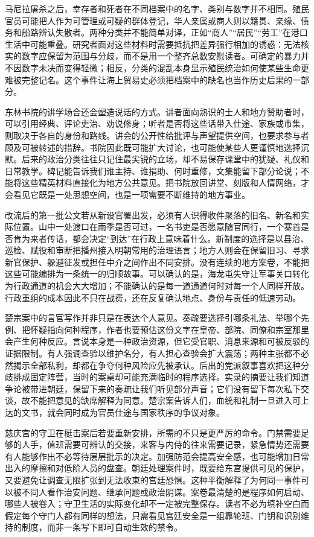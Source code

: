 马尼拉屠杀之后，幸存者和死者在不同档案中的名字、类别与数字并不相同。殖民官员可能把人作为可管理或可疑的群体登记，华人亲属或商人则以籍贯、亲缘、债务和船路辨认失散者。两种分类并不能简单对译，正如“商人”“居民”“劳工”在港口生活中可能重叠。研究者面对这些材料时需要抵抗把差异强行相加的诱惑：无法核实的数字应保留为范围与分歧，而不是用一个整齐总数安慰读者。可确定的暴力并不因数字未决而变得轻微；相反，分类的混乱本身显示殖民统治如何使某些生命更难被完整记名。这个事件让海上贸易史必须把档案中的缺名也当作历史后果的一部分。

东林书院的讲学场合还会塑造说话的方式。讲者面向熟识的士人和地方赞助者时，可以引用经典、评论吏治、劝说修身；听者是否将这些话带入仕途、家族或市集，则取决于各自的身份和路线。讲会的公开性给批评与声望提供空间，也要求参与者顾及可被转述的措辞。书院因此既可能扩大讨论，也可能使某些人更谨慎地选择沉默。后来的政治分类往往只记住最尖锐的立场，却不易保存课堂中的犹疑、礼仪和日常教学。碑记能告诉我们谁主持、谁捐助、何时重修，文集能留下部分论说；不能将这些精英材料直接化为地方公共意见。把书院放回讲堂、刻版和人情网络，才会看见它既是一处思想空间，也是一项需要不断维持的地方事业。

改流后的第一批公文若从新设官署出发，必须有人识得收件聚落的旧名、新名和实际位置。山中一处渡口在雨季是否可过，一名书吏是否愿意随官同行，一个寨首是否肯为来者传话，都会决定“到达”在行政上意味着什么。新制度的选择是以县治、巡检、赋役和审断把播州接入明朝常用的治理语言；地方人则会在保留旧习、寻求新官保护、躲避征发或担任中介之间作出不同安排。没有连续的地方案卷，不能把这些可能编排为一条统一的归顺故事。可以确认的是，海龙屯失守让军事关口转化为行政通道的机会大大增加；不能确认的是每一道通道何时对每一个人同样开放。行政重组的成本因此不只在战费，还在反复确认地点、身份与责任的低速劳动。

楚宗案中的言官写作并非只是在表达个人意见。奏疏要选择引哪条礼法、举哪个先例、把怀疑指向何种程序，作者也要预估这份文字在皇帝、部院、同僚和宗室那里会产生何种反应。言说本身是一种政治资源，但它受官职、消息来源和可被反驳的证据限制。有人强调查验以维护名分，有人担心查验会扩大震荡；两种主张都不必然揭示全部私利，却都在争夺何种风险应先被承认。后出的党派叙事喜欢把这种分歧排成固定阵营，当时的案桌却可能充满临时的程序选择。实录的摘要让我们知道争论被带进朝廷，保留下来的奏疏让我们听见部分声音；它们没有留下每次私下交谈，故不能把意见的缺席解释为同意。楚宗案告诉人们，血统和礼制一旦进入可上达的文书，就会同时成为官员仕途与国家秩序的争议对象。

慈庆宫的守卫在梃击案后若要重新安排，所需的不只是更严厉的命令。门禁需要足够的人手，值班需要可辨认的交接，来客与内侍的往来需要记录，紧急情势还需要有人能够作出不必等待层层批示的决定。加强防范会提高安全感，也可能增加日常出入的摩擦和对低阶人员的盘查。朝廷处理案件时，既要给东宫提供可见的保护，又要避免让调查无限扩张到无法收束的宫廷恐惧。这种平衡解释了为何同一事件可以被不同人看作治安问题、继承问题或政治阴谋。案卷最清楚的是程序如何启动、哪些人被卷入；守卫生活的实际变化却不一定被完整保存。读者不必为填补空白而假定每个守门人都有同样的想法，只需看见宫廷安全是一组靠轮班、门钥和识别维持的制度，而非一条写下即可自动生效的禁令。

